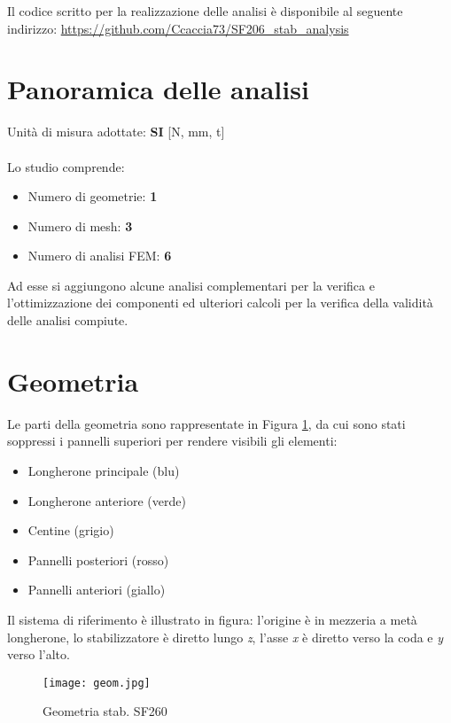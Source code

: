 \documentclass[
10pt, %
a4paper, %
oneside, %
headinclude,footinclude, %
BCOR5mm, %
]{scrartcl}
\begin{document}
Il codice scritto per la realizzazione delle analisi \`{e} disponibile al seguente indirizzo: \url{https://github.com/Ccaccia73/SF206_stab_analysis}



\section{Panoramica delle analisi}

Unit\`{a} di misura adottate: \textbf{SI} [N, mm, t]\\
\\

Lo studio comprende:

\begin{itemize}
	\item Numero di geometrie: \textbf{1}
	\item Numero di mesh: \textbf{3}
	\item Numero di analisi FEM: \textbf{6}
\end{itemize}

Ad esse si aggiungono alcune analisi complementari per la verifica e l'ottimizzazione dei componenti ed ulteriori calcoli per la verifica della validit\`{a} delle analisi compiute.


\section{Geometria}

Le parti della geometria sono rappresentate in Figura \ref{fig:geom}, da cui sono stati soppressi i pannelli superiori per rendere visibili gli elementi:

\begin{itemize}
	\item Longherone principale (blu)
	\item Longherone anteriore (verde)
	\item Centine (grigio)
	\item Pannelli posteriori (rosso)
	\item Pannelli anteriori (giallo)
\end{itemize}

Il sistema di riferimento è illustrato in figura: l'origine è in mezzeria a metà longherone, lo stabilizzatore è diretto lungo \emph{z}, l'asse \emph{x} è diretto verso la coda e \emph{y} verso l'alto.

\begin{figure}[tb]
	\centering 
	\texttt{[image: geom.jpg]} 
	\caption[Geometria stabilizzatore]{Geometria stab. SF260} %
	\label{fig:geom} 
\end{figure}
\end{document}
